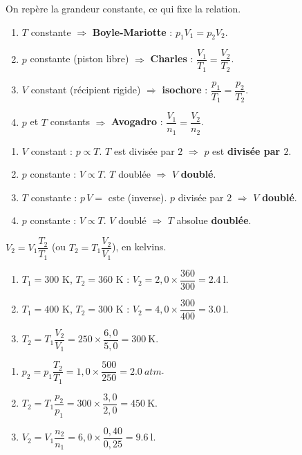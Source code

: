 \documentclass[11pt,a4paper]{article}
\begin{document}
\begin{corrige}
On repère la grandeur constante, ce qui fixe la relation.
\begin{enumerate}[label=\alph*)]
  \item $T$ constante $\Rightarrow$ \textbf{Boyle-Mariotte} : $p_1V_1=p_2V_2$.
  \item $p$ constante (piston libre) $\Rightarrow$ \textbf{Charles} : $\dfrac{V_1}{T_1}=\dfrac{V_2}{T_2}$.
  \item $V$ constant (récipient rigide) $\Rightarrow$ \textbf{isochore} :
        $\dfrac{p_1}{T_1}=\dfrac{p_2}{T_2}$.
  \item $p$ et $T$ constants $\Rightarrow$ \textbf{Avogadro} : $\dfrac{V_1}{n_1}=\dfrac{V_2}{n_2}$.
\end{enumerate}
\end{corrige}

\begin{corrige}
\begin{enumerate}[label=\alph*)]
  \item $V$ constant : $p\propto T$. $T$ est divisée par $2$ $\Rightarrow$ $p$ est \textbf{divisée par $2$}.
  \item $p$ constante : $V\propto T$. $T$ doublée $\Rightarrow$ $V$ \textbf{doublé}.
  \item $T$ constante : $p\,V=$ cste (inverse). $p$ divisée par $2$ $\Rightarrow$ $V$ \textbf{doublé}.
  \item $p$ constante : $V\propto T$. $V$ doublé $\Rightarrow$ $T$ absolue \textbf{doublée}.
\end{enumerate}
\end{corrige}

\begin{corrige}
$V_2=V_1\dfrac{T_2}{T_1}$ (ou $T_2=T_1\dfrac{V_2}{V_1}$), en kelvins.
\begin{enumerate}[label=\alph*)]
  \item $T_1=300$ K, $T_2=360$ K : $V_2=2{,}0\times\dfrac{360}{300}=\qty{2.4}{\litre}$.
  \item $T_1=400$ K, $T_2=300$ K : $V_2=4{,}0\times\dfrac{300}{400}=\qty{3.0}{\litre}$.
  \item $T_2=T_1\dfrac{V_2}{V_1}=250\times\dfrac{6{,}0}{5{,}0}=\qty{300}{\kelvin}$.
\end{enumerate}
\end{corrige}

\begin{corrige}
\begin{enumerate}[label=\alph*)]
  \item $p_2=p_1\dfrac{T_2}{T_1}=1{,}0\times\dfrac{500}{250}=\qty{2.0}{atm}$.
  \item $T_2=T_1\dfrac{p_2}{p_1}=300\times\dfrac{3{,}0}{2{,}0}=\qty{450}{\kelvin}$.
  \item $V_2=V_1\dfrac{n_2}{n_1}=6{,}0\times\dfrac{0{,}40}{0{,}25}=\qty{9.6}{\litre}$.
\end{enumerate}
\end{corrige}
\end{document}
